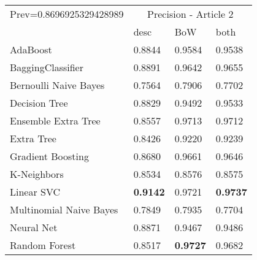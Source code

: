 \begin{tabular}{|l|l|l|l| }
\hline
Prev=0.8696925329428989 &  \multicolumn{3}{c|}{Precision - Article 2} \\
\cline{2-4} & desc & BoW & both \\ \hline
AdaBoost                & 0.8844 & 0.9584 & 0.9538\\
BaggingClassifier       & 0.8891 & 0.9642 & 0.9655\\
Bernoulli Naive Bayes   & 0.7564 & 0.7906 & 0.7702\\
Decision Tree           & 0.8829 & 0.9492 & 0.9533\\
Ensemble Extra Tree     & 0.8557 & 0.9713 & 0.9712\\
Extra Tree              & 0.8426 & 0.9220 & 0.9239\\
Gradient Boosting       & 0.8680 & 0.9661 & 0.9646\\
K-Neighbors             & 0.8534 & 0.8576 & 0.8575\\
Linear SVC              & {\bf 0.9142} & 0.9721 & {\bf 0.9737}\\
Multinomial Naive Bayes & 0.7849 & 0.7935 & 0.7704\\
Neural Net              & 0.8871 & 0.9467 & 0.9486\\
Random Forest           & 0.8517 & {\bf 0.9727} & 0.9682\\
\hline
\end{tabular}